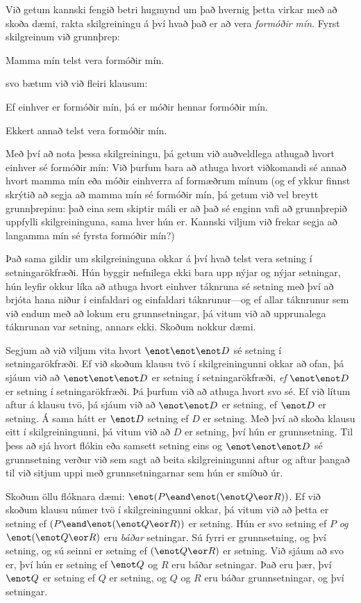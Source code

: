 Við getum kannski fengið betri hugmynd um það hvernig þetta virkar með að skoða dæmi, rakta skilgreiningu á því hvað það er að vera \emph{formóðir mín}. Fyrst skilgreinum við grunnþrep: 
	\begin{ebullet}
		\item Mamma mín telst vera formóðir mín.
	\end{ebullet}
svo bætum við við fleiri klausum:
	\begin{ebullet}
		\item Ef einhver er formóðir mín, þá er móðir hennar formóðir mín.
		\item Ekkert annað telst vera formóðir mín.
	\end{ebullet}
Með því að nota þessa skilgreiningu, þá getum við auðveldlega athugað hvort einhver sé formóðir mín: Við þurfum bara að athuga hvort viðkomandi sé annað hvort mamma mín eða móðir einhverra af formæðrum mínum (og ef ykkur finnst skrýtið að segja að mamma mín sé formóðir mín, þá getum við vel breytt grunnþrepinu: það eina sem skiptir máli er að það sé enginn vafi að grunnþrepið uppfylli skilgreininguna, sama hver hún er. Kannski viljum við frekar segja að langamma mín sé fyrsta formóðir mín?) 

Það sama gildir um skilgreininguna okkar á því hvað telst vera setning í setningarökfræði. Hún byggir nefnilega ekki bara upp nýjar og nýjar setningar, hún leyfir okkur líka að athuga hvort einhver táknruna sé setning með því að brjóta hana niður í einfaldari og einfaldari táknrunur---og ef allar táknrunur sem við endum með að lokum eru grunnsetningar, þá vitum við að upprunalega táknrunan var setning, annars ekki. Skoðum nokkur dæmi.

Segjum að við viljum vita hvort $\enot \enot \enot D$ sé setning í setningarökfræði. Ef við skoðum klausu tvö í skilgreiningunni okkar að ofan, þá sjáum við að $\enot \enot \enot D$ er setning í setningarökfræði, \emph{ef} $\enot \enot D$ er setning í setningarökfræði. Þá þurfum við að athuga hvort svo sé. Ef við lítum aftur á klausu tvö, þá sjáum við að $\enot \enot D$ er setning, ef $\enot D$ er setning. Á sama hátt er $\enot D$ setning ef $D$ er setning. Með því að skoða klausu eitt í skilgreiningunni, þá vitum við að $D$ er setning, því hún er grunnsetning. Til þess að sjá hvort flókin eða samsett setning eins og $\enot \enot \enot D$ sé grunnsetning verður við sem sagt að beita skilgreiningunni aftur og aftur þangað til við sitjum uppi með grunnsetningarnar sem hún er smíðuð úr.

Skoðum öllu flóknara dæmi: $\enot (P \eand \enot (\enot Q \eor R))$. Ef við skoðum klausu númer tvö í skilgreiningunni okkar, þá vitum við að þetta er setning ef $(P \eand \enot (\enot Q \eor R))$ er setning. Hún er svo setning ef $P$ \emph{og} $\enot (\enot Q \eor R)$ eru \emph{báðar} setningar. Sú fyrri er grunnsetning, og því setning, og sú seinni er setning ef $(\enot Q \eor R)$ er setning. Við sjáum að svo er, því hún er setning ef $\enot Q$  og $R$ eru báðar setningar. Það eru þær, því $\enot Q$ er setning ef $Q$ er setning, og $Q$ og $R$ eru báðar grunnsetningar, og því setningar.

